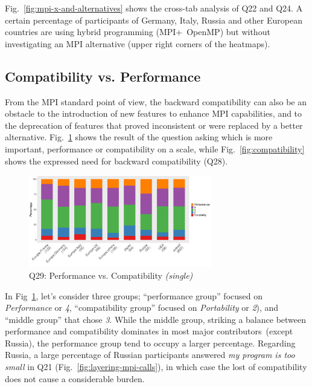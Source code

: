 \documentclass[preprint,5p,times]{elsarticle}
\def\myquote#1{{\it #1}}
\newcommand{\revision}[2]{{\color{blue}#2}}
\def\mcountries{major contributors\xspace{}}%
\begin{document}
Fig.~\ref{fig:mpi-x-and-alternatives} shows the cross-tab analysis of Q22 and
Q24. A certain percentage of participants of Germany, Italy, Russia and other
European countries are using hybrid programming (MPI+\ OpenMP) but without
investigating \revision{the}{an} MPI alternative (upper right corners of the heatmaps).

\subsection{Compatibility vs. Performance}

\revision{In the history of MPI, portability, which translates into maintaining backward
compatibility across versions, has been of paramount importance. From the MPI
standard point of view it}{From the MPI
standard point of view, the backward compatibility} can also be an
obstacle to the introduction of new 
features to enhance MPI capabilities, and to the deprecation of features that
proved inconsistent or were replaced by \revision{}{a} better alternative.
Fig.~\ref{fig:performance-vs-compatibility} shows the result of the question
asking which is more important, performance or compatibility on a scale, while
Fig.~\ref{fig:compatibility} shows the expressed need for backward compatibility
(Q28).

\begin{figure}[tb]
\begin{center}
\includegraphics[width=8.0cm]{R-scripts/Q29.pdf}
\caption{Q29: Performance vs. Compatibility {\it(single)}}
\label{fig:performance-vs-compatibility}
\vspace{-3mm}%
\end{center}
\end{figure}

In Fig~\ref{fig:performance-vs-compatibility}, let's consider three
groups; ``performance group'' focused on \myquote{Performance} or
  \myquote{4}, ``compatibility group'' focused on
    \myquote{Portability} or \myquote{2}), and ``middle group''
    \revision{who}{that} chose \myquote{3}. While the middle group,
    striking a balance 
between performance and compatibility dominates in most \mcountries\ (\revision{excepting}{except}
Russia), the performance group tend to occupy a larger percentage. Regarding
Russia, a large percentage of Russian participants answered \myquote{my program
is too small} in Q21 (Fig.~\ref{fig:layering-mpi-calls}), in which case the lost
of compatibility does not cause a considerable burden.
\end{document}
